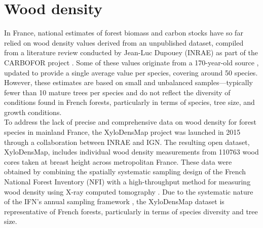 \chapter{Wood density\label{chap::xdm}}

In France, national estimates of forest biomass and carbon stocks have so far relied on wood density values derived from an unpublished dataset, compiled from a literature review conducted by Jean-Luc Dupouey (INRAE) as part of the CARBOFOR project \parencite{Loustau2004}. Some of these values originate from a 170-year-old source \parencite{Mathieu1855}, updated to provide a single average value per species, covering around 50 species. However, these estimates are based on small and unbalanced samples—typically fewer than 10 mature trees per species and do not reflect the diversity of conditions found in French forests, particularly in terms of species, tree size, and growth conditions. \\

To address the lack of precise and comprehensive data on wood density for forest species in mainland France, the Xylo\-Dens\-Map project was launched in 2015 through a collaboration between INRAE and IGN. The resulting open dataset, Xylo\-Dens\-Map, includes individual wood density measurements from \num{110763} wood cores taken at breast height across metropolitan France. These data were obtained by combining the spatially systematic sampling design of the French National Forest Inventory (NFI) with a high-throughput method for measuring wood density using X-ray computed tomography \parencite{Freyburger2009,Jacquin2019}. Due to the systematic nature of the IFN's annual sampling framework \parencite{Bontemps2024,Bouriaud2023}, the Xylo\-Dens\-Map dataset is representative of French forests, particularly in terms of species diversity and tree size. \\


